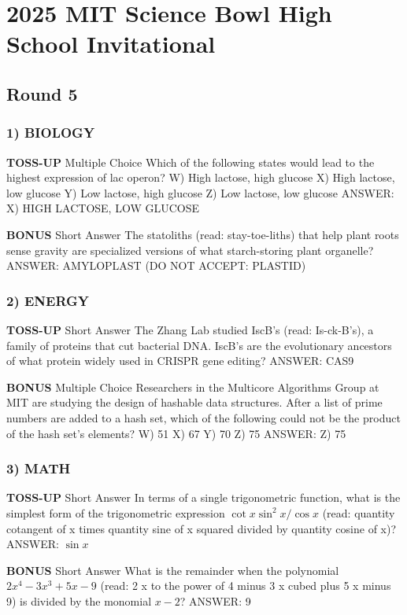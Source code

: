 \documentclass{article}
\begin{document}
\section*{2025 MIT Science Bowl High School Invitational}
\subsection*{Round 5}

\subsubsection*{1) BIOLOGY}
\textbf{TOSS-UP}
Multiple Choice Which of the following states would lead to the highest expression of lac operon?
W) High lactose, high glucose
X) High lactose, low glucose
Y) Low lactose, high glucose
Z) Low lactose, low glucose
ANSWER: X) HIGH LACTOSE, LOW GLUCOSE

\textbf{BONUS}
Short Answer The statoliths (read: stay-toe-liths) that help plant roots sense gravity are specialized versions of what starch-storing plant organelle?
ANSWER: AMYLOPLAST (DO NOT ACCEPT: PLASTID)

\subsubsection*{2) ENERGY}
\textbf{TOSS-UP}
Short Answer The Zhang Lab studied IscB's (read: Is-ck-B's), a family of proteins that cut bacterial DNA. IscB's are the evolutionary ancestors of what protein widely used in CRISPR gene editing?
ANSWER: CAS9

\textbf{BONUS}
Multiple Choice Researchers in the Multicore Algorithms Group at MIT are studying the design of hashable data structures. After a list of prime numbers are added to a hash set, which of the following could not be the product of the hash set's elements?
W) 51
X) 67
Y) 70
Z) 75
ANSWER: Z) 75

\subsubsection*{3) MATH}
\textbf{TOSS-UP}
Short Answer In terms of a single trigonometric function, what is the simplest form of the trigonometric expression $\cot x \sin^{2}x / \cos x$ (read: quantity cotangent of x times quantity sine of x squared divided by quantity cosine of x)?
ANSWER: $\sin x$

\textbf{BONUS}
Short Answer What is the remainder when the polynomial $2x^{4}-3x^{3}+5x-9$ (read: 2 x to the power of 4 minus 3 x cubed plus 5 x minus 9) is divided by the monomial $x - 2$?
ANSWER: 9
\end{document}
